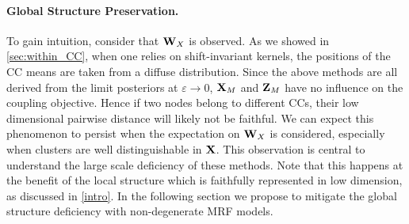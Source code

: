 \paragraph{Global Structure Preservation. }
To gain intuition, consider that ${\mathbf{W}}_{X}$ is observed. As we showed in \cref{sec:within_CC}, when one relies on shift-invariant kernels, the positions of the CC means are taken from a diffuse distribution. Since the above methods are all derived from the limit posteriors at $\varepsilon \to 0$, $\mathbf{X}_{M}$ and $\mathbf{Z}_{M}$ have no influence on the coupling objective. Hence if two nodes belong to different CCs, their low dimensional pairwise distance will likely not be faithful. We can expect this phenomenon to persist when the expectation on ${\mathbf{W}}_{X}$ is considered, especially when clusters are well distinguishable in $\mathbf{X}$. This observation is central to understand the large scale deficiency of these methods. Note that this happens at the benefit of the local structure which is faithfully represented in low dimension, as discussed in \cref{intro}. In the following section we propose to mitigate the global structure deficiency with non-degenerate MRF models.